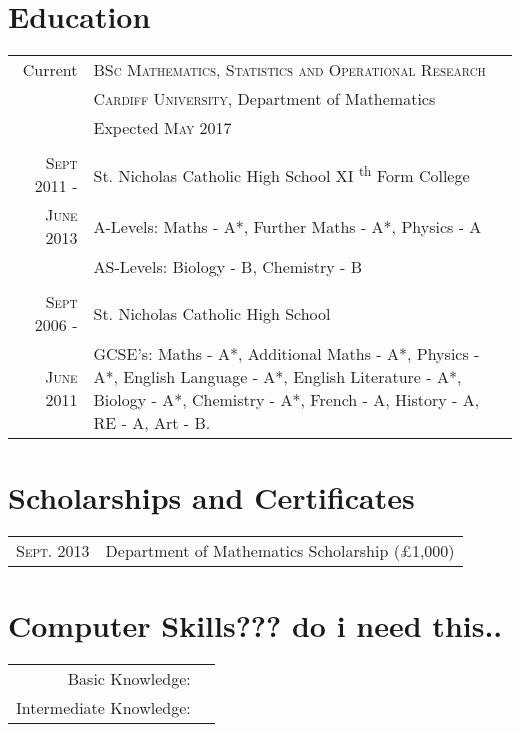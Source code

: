 \documentclass[a4paper, 11pt]{article}
\begin{document}
\section{Education}
\begin{tabular}{rp{12cm}}

Current & \textsc{BSc Mathematics, Statistics and Operational Research} \\
&\normalsize \textsc{Cardiff University}, Department of Mathematics\\
& Expected \textsc{May} 2017\\
\\
\textsc{Sept 2011 -} & St. Nicholas Catholic High School XI \textsuperscript{th} Form College\\
\textsc{June 2013} & A-Levels: Maths - A*, Further Maths - A*, Physics - A\\
& AS-Levels: Biology - B, Chemistry - B\\
\\
\textsc{Sept 2006 -} & St. Nicholas Catholic High School\\
\textsc{June 2011} & GCSE's: Maths - A*, Additional Maths - A*, Physics - A*, English Language - A*, English Literature - A*, Biology - A*, Chemistry - A*, French - A, History - A, RE - A, Art - B.\\

\end{tabular}
\section{Scholarships and Certificates}
\begin{tabular}{rl}

\textsc{Sept.} 2013 & Department of Mathematics Scholarship (\pounds1,000)\\

\end{tabular}
\section{Computer Skills??? do i need this..}
\begin{tabular}{rl}

Basic Knowledge: & \\
Intermediate Knowledge: &\\

\end{tabular}
\end{document}
